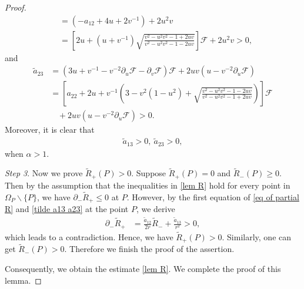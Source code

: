 \documentclass[10pt,leqno]{amsart}
\numberwithin{equation}{section}
\begin{document}
\begin{proof}
\begin{equation*}
\begin{aligned}
			& = (- a_{12} +4u +2v^{-1})+ 2u^2 v \\
			& = \left[ 2u + (u + v^{-1}) \sqrt{\frac{v^2-u^{2}v^2-1+2uv}{v^2-u^{2}v^2-1-2uv}} \right] \mathcal{F} + 2u^2 v  > 0,
		\end{aligned}
	\end{equation*}	
	and
	\begin{equation*} 
		\begin{aligned}
			\tilde{a}_{23} &= ( 3u + v^{-1} - v^{-2}  \partial_{u} \mathcal{F} - \partial_{v} \mathcal{F} ) \mathcal{F} + 2uv (u - v^{-2}  \partial_{u} \mathcal{F}) \\
			& = \left[ a_{22} + 2u + v^{-1} \left( 3- v^{2} (1-u^{2}) + \sqrt{\frac{v^2-u^{2}v^2-1-2uv}{v^2-u^{2}v^2-1+2uv}} \right) \right] \mathcal{F} \\
			& \ \ \ \ + 2uv (u - v^{-2}  \partial_{u} \mathcal{F})  > 0.
		\end{aligned}
	\end{equation*}	
	Moreover, it is clear that 
	\begin{equation} \label{tilde a13 a23} 
		\begin{aligned}
			\tilde{a}_{13}>0, \ \tilde{a}_{23}>0,
		\end{aligned}
	\end{equation}	
	when $ \alpha > 1$.
	
	
	{\textit{Step 3}}.	Now we prove $\tilde{R}_{+} (P) > 0$. Suppose $\tilde{R}_{+}(P) = 0$ and $\tilde{R}_{-}(P) \geq 0$. Then by the assumption that the inequalities in \eqref{lem R} hold for every point in $\Omega_{P} \backslash \{P\}$, we have $\partial_{-}\tilde{R}_{+} \leq 0$ at $P$. However, by the first equation of \eqref{eq of partial R} and \eqref{tilde a13 a23} at the point $P$, we derive
	\begin{equation*} 
		\begin{aligned}
			\partial_{-} \tilde{R}_{+} & = \frac{\tilde{a}_{12}}{2r} \tilde{R}_{-} + \frac{\tilde{a}_{13}}{r^2} > 0 ,
		\end{aligned}
	\end{equation*}	
	which leads to a contradiction. Hence, we have
	$\tilde{R}_{+}(P) > 0$. Similarly, one can get $\tilde{R}_{-}(P)> 0$. Therefore we finish the proof of the
	assertion. 
	
	Consequently, we obtain the estimate \eqref{lem R}. We complete the proof of this lemma.
	
\end{proof}
\end{document}
